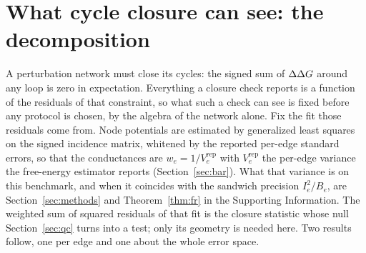 \section{What cycle closure can see: the decomposition}\label{sec:decomp}
A perturbation network must close its cycles: the signed sum of $\Delta\Delta G$ around any loop is zero in
expectation. Everything a closure check reports is a function of the residuals of that constraint,
so what such a check can see is fixed before any protocol is chosen, by the algebra of the network
alone. Fix the fit those residuals come from. Node potentials are estimated by generalized least
squares on the signed incidence matrix, whitened by the reported per-edge standard errors, so that
the conductances are $w_e=1/V_e^{\mathrm{rep}}$ with $V_e^{\mathrm{rep}}$ the per-edge variance the
free-energy estimator reports (Section~\ref{sec:bar}). What that variance is on this benchmark,
and when it coincides with the sandwich precision $I_e^2/B_e$, are Section~\ref{sec:methods} and
Theorem~\ref{thm:fr} in the Supporting Information.
The weighted sum of squared residuals of that fit is the closure statistic whose null
Section~\ref{sec:qc} turns into a test; only its geometry is needed here. Two results follow, one
per edge and one about the whole error space.

